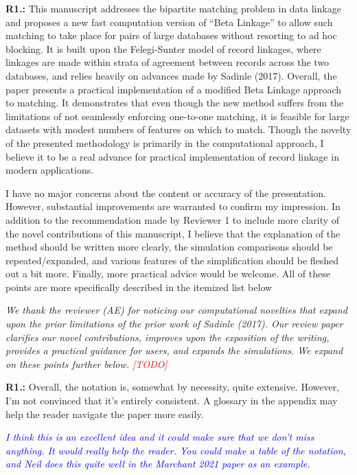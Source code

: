 \documentclass[letterpaper, parskip]{scrartcl}
\newcommand{\pointRaised}[2]{%
	\textbf{#1.\theresponsectr:} #2
}
\newcounter{responsectr}[section]     %
\newcommand{\reply}[1]{%
	\refstepcounter{responsectr}%
		\begin{tcolorbox}
			\itshape #1
		\end{tcolorbox}
}
\newcommand{\todo}{\textcolor{red}{[TODO]}\xspace}
\begin{document}
	\pointRaised{R1}{%
	This manuscript addresses the bipartite matching problem in data linkage and proposes a new fast computation version of “Beta Linkage” to allow such matching to take place for pairs of large databases without resorting to ad hoc blocking. It is built upon the Felegi-Sunter model of record linkages, where linkages are made within strata of agreement between records across the two databases, and relies heavily on advances made by Sadinle (2017). Overall, the paper presents a practical implementation of a modified Beta Linkage approach to	matching. It demonstrates that even though the new method suffers from the limitations of not seamlessly enforcing one-to-one matching, it is feasible for large datasets with modest numbers of features on which to match. Though the novelty of the presented methodology is primarily in the computational approach, I believe it to be a real advance for practical implementation of record linkage in modern applications.
	
	I have no major concerns about the content or accuracy of the presentation. However, substantial improvements are warranted to confirm my impression. In addition to the recommendation made by Reviewer 1 to include more clarity of the novel contributions of this manuscript, I believe that the explanation of the method should be written more clearly, the simulation comparisons should be repeated/expanded, and various features of the simplification should be fleshed out a bit more. Finally, more practical advice would be welcome. All of these points are more specifically described in the itemized list below
	}

	\reply{%
	We thank the reviewer (AE) for noticing our computational novelties that expand upon the prior limitations of the prior work of Sadinle (2017). Our review paper clarifies our novel contributions, improves upon the exposition of the writing, provides a practical guidance for users, and expands the simulations. We expand on these points further below. \todo
	}


	\pointRaised{R1}{%
		Overall, the notation is, somewhat by necessity, quite extensive. However, I’m not convinced that it’s entirely consistent. A glossary in the appendix may help the reader navigate the paper more easily.}
\reply{%
	\textcolor{blue}{I think this is an excellent idea and it could make sure that we don't miss anything. It would really help the reader. You could make a table of the notation, and Neil does this quite well in the Marchant 2021 paper as an example.}
}
\end{document}
